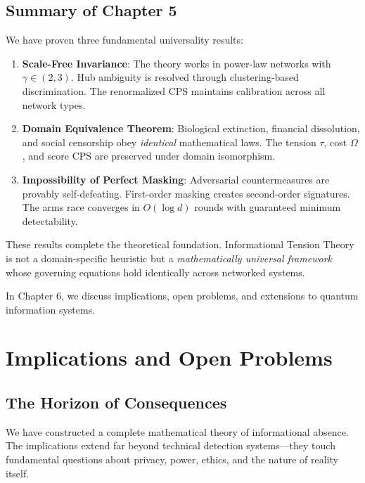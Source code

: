 \documentclass[12pt,a4paper]{article}
\theoremstyle{definition}
\theoremstyle{remark}
\begin{document}
\subsection{Summary of Chapter 5}

We have proven three fundamental universality results:

\begin{enumerate}
    \item \textbf{Scale-Free Invariance}: The theory works in power-law networks with $\gamma \in (2, 3)$. Hub ambiguity is resolved through clustering-based discrimination. The renormalized CPS maintains calibration across all network types.
    
    \item \textbf{Domain Equivalence Theorem}: Biological extinction, financial dissolution, and social censorship obey \emph{identical} mathematical laws. The tension $\tau$, cost $\Omega$, and score CPS are preserved under domain isomorphism.
    
    \item \textbf{Impossibility of Perfect Masking}: Adversarial countermeasures are provably self-defeating. First-order masking creates second-order signatures. The arms race converges in $O(\log d)$ rounds with guaranteed minimum detectability.
\end{enumerate}

These results complete the theoretical foundation. Informational Tension Theory is not a domain-specific heuristic but a \emph{mathematically universal framework} whose governing equations hold identically across networked systems.

In Chapter 6, we discuss implications, open problems, and extensions to quantum information systems.

\newpage
\section{Implications and Open Problems}

\subsection{The Horizon of Consequences}

We have constructed a complete mathematical theory of informational absence. The implications extend far beyond technical detection systems—they touch fundamental questions about privacy, power, ethics, and the nature of reality itself.
\end{document}
